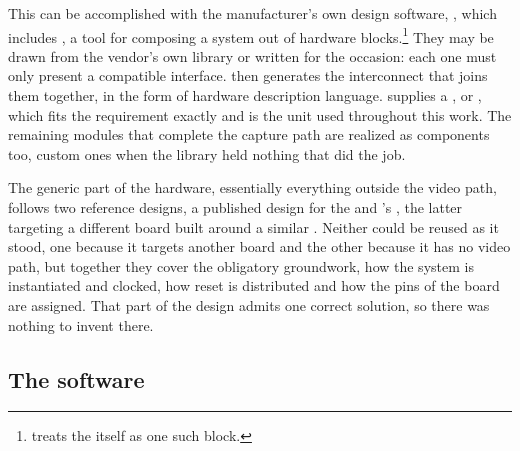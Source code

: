 This can be accomplished with the manufacturer's own design software, , which includes , a tool for composing a system out of hardware blocks.\footnote{ treats the  itself as one such block.} They may be drawn from the vendor's own library or written for the occasion: each one must only present a compatible interface.  then generates the interconnect that joins them together, in the form of hardware description language.  supplies a , or , which fits the requirement exactly and is the unit used throughout this work. The remaining modules that complete the capture path are realized as  components too, custom ones when the library held nothing that did the job.

The generic part of the hardware, essentially everything outside the video path, follows two reference designs, a published design for the  \cite{UPM-DE1} and 's  \cite{GHRD}, the latter targeting a different board built around a similar . Neither could be reused as it stood, one because it targets another board and the other because it has no video path, but together they cover the obligatory groundwork, how the system is instantiated and clocked, how reset is distributed and how the pins of the board are assigned. That part of the design admits one correct solution, so there was nothing to invent there.

\subsection{The software}

